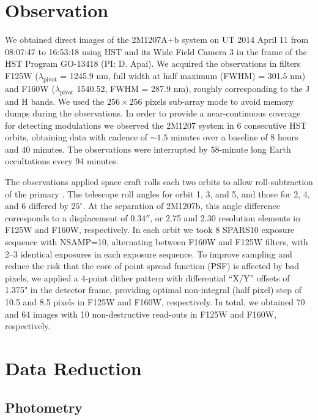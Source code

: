 \documentclass[apj]{emulateapj}
\begin{document}
\section{Observation}



We obtained direct images of the 2M1207A+b system on UT 2014 April 11
from 08:07:47 to 16:53:18 using HST and its Wide Field Camera 3
\citep[WFC3, pixel scale=$0.130$mas/pixel, ][]{Mackenty2008} in the frame of
the HST Program GO-13418 (PI: D. Apai). We acquired the observations
in filters F125W ($\lambda_{\mathrm{pivot}}$ = 1245.9 nm, full width
at half maximum (FWHM) = 301.5 nm) and F160W
($\lambda_{\mathrm{pivot}}$ 1540.52, FWHM = 287.9 nm), roughly
corresponding to the J and H bands. We used the $256\times256$ pixels
sub-array mode to avoid memory dumps during the observations.  In
order to provide a near-continuous coverage for detecting modulations
we observed the 2M1207 system in 6 consecutive HST orbits, obtaining
data with cadence of $\sim1.5$ minutes over a baseline of 8 hours and
40 minutes. The observations were interrupted by 58-minute long Earth
occultations every 94 minutes.

The observations applied space craft rolls each two orbits to allow
roll-subtraction of the primary \citep[e.g.][]{Song2006}. The
telescope roll angles for orbit 1, 3, and 5, and those for 2, 4, and 6
differed by $25^{\circ}$. At the separation of 2M1207b, this angle
difference corresponds to a displacement of $0.34''$, or 2.75 and 2.30
resolution elements in F125W and F160W, respectively. In each orbit we
took 8 SPARS10 exposure sequence with NSAMP=10, alternating between
F160W and F125W filters, with 2--3 identical exposures in each
exposure sequence. To improve sampling and reduce the risk that the
core of point spread function (PSF) is affected by bad pixels, we
applied a 4-point dither pattern with differential ``X/Y'' offsets of
1.375" in the detector frame, providing optimal non-integral (half
pixel) step of 10.5 and 8.5 pixels in F125W and F160W,
respectively. In total, we obtained 70 and 64 images with 10 non-destructive
read-outs in F125W and F160W, respectively.

\section{Data Reduction}



\subsection{Photometry}
\end{document}
